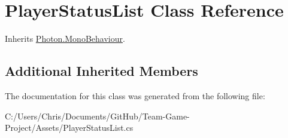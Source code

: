 \hypertarget{class_player_status_list}{}\section{Player\+Status\+List Class Reference}
\label{class_player_status_list}


Inherits \hyperlink{class_photon_1_1_mono_behaviour}{Photon.\+Mono\+Behaviour}.

\subsection*{Additional Inherited Members}


The documentation for this class was generated from the following file\+:\begin{DoxyCompactItemize}
\item 
C\+:/\+Users/\+Chris/\+Documents/\+Git\+Hub/\+Team-\/\+Game-\/\+Project/\+Assets/Player\+Status\+List.\+cs\end{DoxyCompactItemize}
